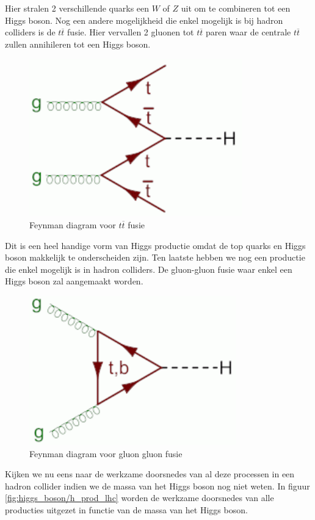 \documentclass[../main.tex]{subfiles}
\begin{document}
Hier stralen 2 verschillende quarks een $W$ of $Z$ uit om te combineren tot een Higgs boson. Nog een andere mogelijkheid die enkel mogelijk is bij hadron colliders is de $t\overline t$ fusie. Hier vervallen 2 gluonen tot $t\overline t$ paren waar de centrale $t\overline t$ zullen annihileren tot een Higgs boson.

\begin{figure}[h]
    \centering
    \includegraphics[width=0.5\linewidth]{higgs_boson/tt_fusie.png}
    \caption{Feynman diagram voor $t\overline t$ fusie}%
    \label{fig:higgs_boson/tt_fusie}
\end{figure}

Dit is een heel handige vorm van Higgs productie omdat de top quarks en Higgs boson makkelijk te onderscheiden zijn. Ten laatste hebben we nog een productie die enkel mogelijk is in hadron colliders. De gluon-gluon fusie waar enkel een Higgs boson zal aangemaakt worden.

\begin{figure}[h]
    \centering
    \includegraphics[width=0.5\linewidth]{higgs_boson/gluon_gluon_fusie.png}
    \caption{Feynman diagram voor gluon gluon fusie}%
    \label{fig:higgs_boson/gluon_gluon_fusie}
\end{figure}

Kijken we nu eens naar de werkzame doorsnedes van al deze processen in een hadron collider indien we de massa van het Higgs boson nog niet weten. In figuur \ref{fig:higgs_boson/h_prod_lhc} worden de werkzame doorsnedes van alle producties uitgezet in functie van de massa van het Higgs boson.
\end{document}

